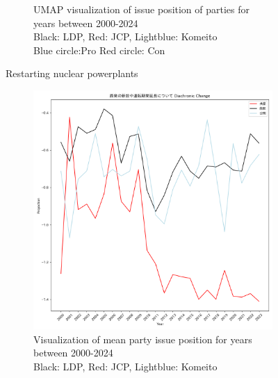 \documentclass[final,5p,times,twocolumn,authoryear]{elsarticle}
\begin{document}
\begin{figure}[h]
\begin{subfigure}{0.48\textwidth}
		  \caption{UMAP visualization of issue position of parties for years between 2000-2024 \\\hspace{\textwidth} 
		  Black: LDP, Red: JCP, Lightblue: Komeito\\\hspace{\textwidth}
		  Blue circle:Pro Red circle: Con}
		\end{subfigure}
	\caption{Restarting nuclear powerplants}
	\label{fig: results-diachronic-nuclear-restart}
\end{figure}

\begin{figure}[h]
	\centering
		\begin{subfigure}{0.48\textwidth}
		  \centering
		  \includegraphics[width=\textwidth]{figs/results/diachronic_nuclear/newplants_diachronic_change.png}
		  \caption{Visualization of mean party issue position for years between 2000-2024 \\\hspace{\textwidth} Black: LDP, Red: JCP, Lightblue: Komeito}
		  \label{fig:sub1}
		\end{subfigure}
		\hfill
		\begin{subfigure}{0.48\textwidth}
		  \centering

\end{subfigure}
\end{figure}
\end{document}
